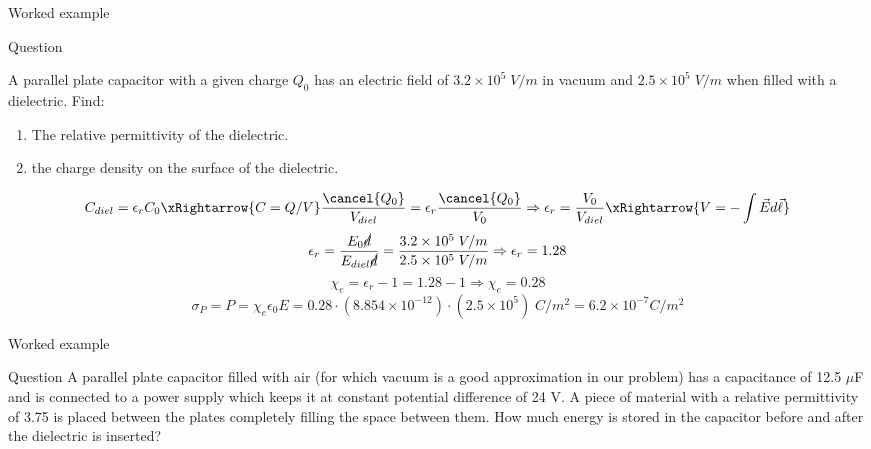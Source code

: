 %
%

{
\problemslide

%
%
%

\begin{frame}{Worked example}

\begin{blockexmplque}{Question}

A parallel plate capacitor with a given charge $Q_0$ has an electric field of
$3.2 \times 10^5 \; V/m$ in vacuum and
$2.5 \times 10^5 \; V/m$ when filled with a dielectric.
Find:
\begin{enumerate}
   \item The relative permittivity of the dielectric.
   \item the charge density on the surface of the dielectric.
\end{enumerate}

\end{blockexmplque}

\begin{equation*}
  C_{diel} = \epsilon_r C_0 \xRightarrow{C=Q/V}
 \frac{\cancel{Q_0}}{V_{diel}} = \epsilon_r \frac{\cancel{Q_0}}{V_{0}} \Rightarrow
 \epsilon_r = \frac{V_{0}}{V_{diel}}  \xRightarrow{V = -\int \vec{E} d\vec{\ell}}
\end{equation*}
\begin{equation*}
  \epsilon_r = \frac{E_{0} \cancel{d}}{E_{diel}\cancel{d}} =
                       \frac{3.2 \times 10^5 \; V/m}{2.5 \times 10^5 \; V/m}
  \Rightarrow
  \epsilon_r = 1.28
\end{equation*}
\begin{equation*}
  \chi_e = \epsilon_r - 1 = 1.28 - 1 \Rightarrow \chi_e = 0.28
\end{equation*}
\begin{equation*}
  \sigma_P = P = \chi_e \epsilon_0 E =
      0.28 \cdot (8.854 \times 10^{-12}) \cdot (2.5 \times 10^5) \; C/m^2 = 6.2 \times 10^{-7} C/m^2
\end{equation*}


\end{frame}

%
%
%

\begin{frame}{Worked example}

\begin{blockexmplque}{Question}
A parallel plate capacitor filled with air (for which vacuum is a good approximation in our problem)
has a capacitance of 12.5 $\mu$F and is connected to a power supply which keeps it at constant
potential difference of 24 V. A piece of material with a relative permittivity of 3.75 is placed
between the plates completely filling the space between them.
How much energy is stored in the capacitor before and after the dielectric is inserted?
\end{blockexmplque}
\vspace{0.2cm}


\end{frame}}
